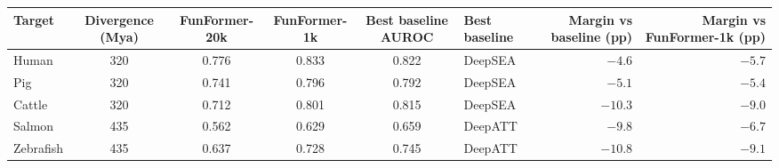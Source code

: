 \begin{tabular}{l c c c c l r r}
\toprule
Target & Divergence (Mya) & FunFormer-20k & FunFormer-1k & Best baseline AUROC & Best baseline & Margin vs baseline (pp) & Margin vs FunFormer-1k (pp) \\
\midrule
Human & 320 & 0.776 & 0.833 & 0.822 & DeepSEA & $-4.6$ & $-5.7$ \\
Pig & 320 & 0.741 & 0.796 & 0.792 & DeepSEA & $-5.1$ & $-5.4$ \\
Cattle & 320 & 0.712 & 0.801 & 0.815 & DeepSEA & $-10.3$ & $-9.0$ \\
Salmon & 435 & 0.562 & 0.629 & 0.659 & DeepATT & $-9.8$ & $-6.7$ \\
Zebrafish & 435 & 0.637 & 0.728 & 0.745 & DeepATT & $-10.8$ & $-9.1$ \\
\bottomrule
\end{tabular}
